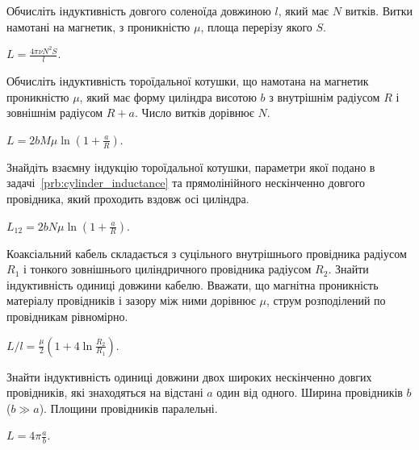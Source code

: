\begin{problem}
    Обчисліть індуктивність довгого соленоїда довжиною $l$, який має $N$ витків. Витки намотані на магнетик, з проникністю $\mu$, площа перерізу якого $S$.
\begin{solution}
	$L = \frac{4\pi\nu N^2 S}{l}$.
\end{solution}
\end{problem}

\begin{problem}\label{prb:cylinder_inductance}
    Обчисліть індуктивність тороїдальної котушки, що намотана на магнетик проникністю $\mu$, який має форму циліндра висотою $b$ з внутрішнім радіусом $R$ і зовнішнім радіусом $R + a$. Число витків дорівнює $N$.
\begin{solution}
	$L  = 2bM\mu\ln\left( 1 + \frac{a}{R}\right) $.
\end{solution}
\end{problem}

\begin{problem}
    Знайдіть взаємну індукцію тороїдальної котушки, параметри якої подано в задачі~\ref{prb:cylinder_inductance} та прямолінійного нескінченно довгого провідника, який проходить вздовж осі циліндра.
\begin{solution}
	$L_{12} = 2bN\mu \ln\left( 1 + \frac{a}{R}\right) $.
\end{solution}
\end{problem}

\begin{problem}%
Коаксіальний кабель складається з суцільного внутрішнього провідника радіусом $R_1$ і тонкого зовнішнього циліндричного провідника радіусом $R_2$. Знайти індуктивність одиниці довжини кабелю. Вважати, що магнітна проникність матеріалу провідників і зазору між ними дорівнює $\mu$, струм розподілений по провідникам рівномірно.
\begin{solution}
	$L/l = \frac{\mu}{2} \left( 1 + 4\ln\frac{R_2}{R_1}\right)$.
\end{solution}
\end{problem}

\begin{problem}\label{prb:inductance_two_plates}
Знайти індуктивність одиниці довжини двох широких нескінченно довгих провідників, які знаходяться на відстані $a$ один від одного. Ширина провідників $b$ ($b \gg a$). Площини провідників паралельні.
\begin{solution}
	$L = 4\pi\frac{a}{b}$.
\end{solution}
\end{problem}

